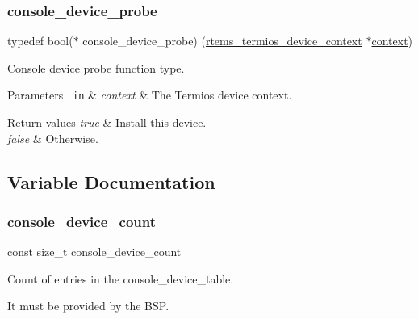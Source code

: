 \subsubsection{\texorpdfstring{console\_device\_probe}{console\_device\_probe}}
{\footnotesize\ttfamily typedef bool($\ast$ console\+\_\+device\+\_\+probe) (\mbox{\hyperlink{structrtems__termios__device__context}{rtems\+\_\+termios\+\_\+device\+\_\+context}} $\ast$\mbox{\hyperlink{sun4u_2tte_8h_a9b4a99475e2709333b8e5d70483173f1}{context}})}



Console device probe function type. 


\begin{DoxyParams}[1]{Parameters}
\mbox{\texttt{ in}}  & {\em context} & The Termios device context.\\
\hline
\end{DoxyParams}

\begin{DoxyRetVals}{Return values}
{\em true} & Install this device. \\
\hline
{\em false} & Otherwise. \\
\hline
\end{DoxyRetVals}


\subsection{Variable Documentation}
\mbox{\label{group__ConsoleTermios_gabca2c9c9873b0482f9fd306e6bade017}} 
\subsubsection{\texorpdfstring{console\_device\_count}{console\_device\_count}}
{\footnotesize\ttfamily const size\+\_\+t console\+\_\+device\+\_\+count}



Count of entries in the console\+\_\+device\+\_\+table. 

It must be provided by the B\+SP. \mbox{\label{group__ConsoleTermios_ga7f058e756eb724397922b823131fba5c}} 
